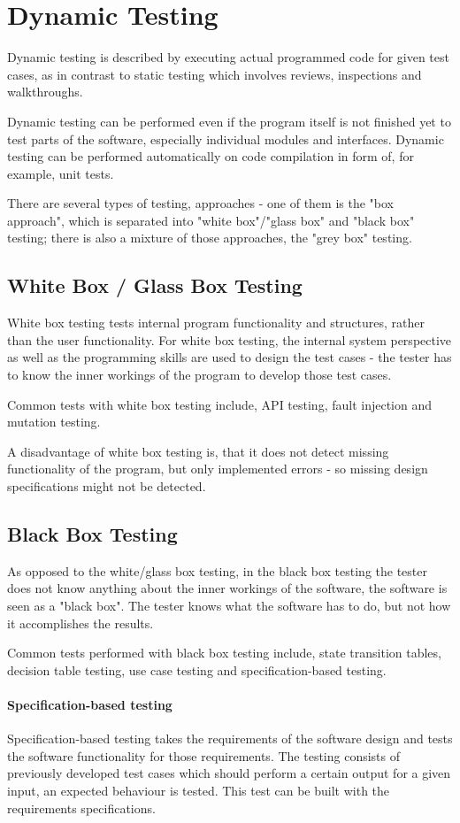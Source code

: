 \documentclass[11pt,a4paper,oneside,svgnames]{report}
\begin{document}
\section{Dynamic Testing}
Dynamic testing is described by executing actual programmed code for given test cases, as in contrast to static testing which involves reviews, inspections and walkthroughs.

Dynamic testing can be performed even if the program itself is not finished yet to test parts of the software, especially individual modules and interfaces. Dynamic testing can be performed automatically on code compilation in form of, for example, unit tests.

There are several types of testing, approaches - one of them is the "box approach", which is separated into "white box"/"glass box" and "black box" testing; there is also a mixture of those approaches, the "grey box" testing.

\subsection{White Box / Glass Box Testing}
White box testing tests internal program functionality and structures, rather than the user functionality. For white box testing, the internal system perspective as well as the programming skills are used to design the test cases - the tester has to know the inner workings of the program to develop those test cases.

Common tests with white box testing include, API testing, fault injection and mutation testing.

A disadvantage of white box testing is, that it does not detect missing functionality of the program, but only implemented errors - so missing design specifications might not be detected.

\subsection{Black Box Testing}
As opposed to the white/glass box testing, in the black box testing the tester does not know anything about the inner workings of the software, the software is seen as a "black box". The tester knows what the software has to do, but not how it accomplishes the results.

Common tests performed with black box testing include, state transition tables, decision table testing, use case testing and specification-based testing.

\paragraph{Specification-based testing}
Specification-based testing takes the requirements of the software design and tests the software functionality for those requirements. The testing consists of previously developed test cases which should perform a certain output for a given input, an expected behaviour is tested. This test can be built with the requirements specifications.
\end{document}

